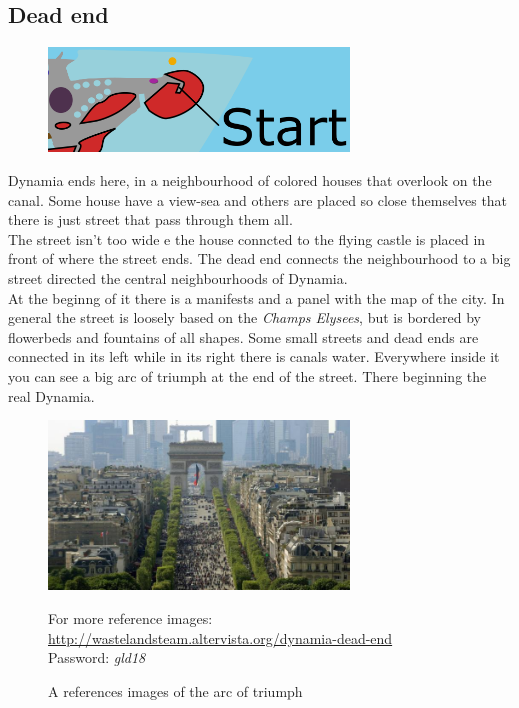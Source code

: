 \subsection{Dead end}
\begin{figure}[H]
    \centering
    \includegraphics[width=8cm]{Images/Maps/deadEnd}
  \end{figure}
Dynamia ends here, in a neighbourhood of colored houses that overlook on the canal. Some house have a view-sea and others are placed so close themselves that there is just street that pass through them all. \\
The street isn't too wide e the house conncted to the flying castle is placed in front of where the street ends. 
The dead end connects the neighbourhood to a big street directed the central neighbourhoods of Dynamia. \\
At the beginng of it there is a manifests and a panel with the map of the city. 
In general the street is loosely based on the \textit{Champs Elysees}, but is bordered by flowerbeds and fountains of all shapes.
Some small streets and dead ends are connected in its left while in its right there is canals water.
Everywhere inside it you can see a big arc of triumph at the end of the street. There beginning the real Dynamia.
\begin{figure}[H]
    \centering
    \includegraphics[width=8cm]{Images/Landmarks/arcOfTriumph}
    \caption{A references images of the arc of triumph}
    For more reference images: \href{http://wastelandsteam.altervista.org/dynamia-dead-end}{http://wastelandsteam.altervista.org/dynamia-dead-end}\\Password: \textit{gld18}
  \end{figure}

